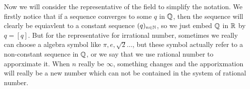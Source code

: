 \documentclass[en,geye,blue,pc,12pt]{elegantnote}
\begin{document}
Now we will consider the representative of the field to simplify the notation. We firstly notice that if a sequence converges to some \(q\) in \(\mathbb{Q} \), then the sequence will clearly be equiavlent to a constant sequence \((q)_{n \in \mathbb{N}}\), so we just embed \(\mathbb{Q}\) in \(\mathbb{R}\) by \(q = [q]\). But for the representative for irrational number, sometimes we really can choose a algebra symbol like \(\pi, e, \sqrt{2}\dots\), but these symbol actually refer to a non-constant sequence in \(\mathbb{Q}\), or we say that we use rational number to apporximate it. When \(n\) really be \(\infty\), something changes and the apporixmation will really be a new number which can not be contained in the system of rational number.
\end{document}
